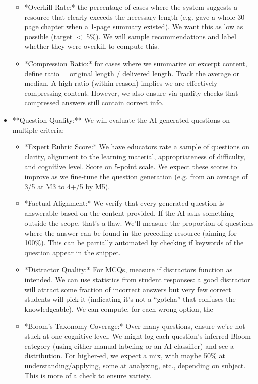 \documentclass[11pt]{article}
\begin{document}
\begin{itemize}
\begin{itemize}
      \item *Overkill Rate:* the percentage of cases where the system suggests a resource that clearly exceeds the necessary length (e.g. gave a whole 30-page chapter when a 1-page summary existed). We want this as low as possible (target $<$ 5\%). We will sample recommendations and label whether they were overkill to compute this.
      \item *Compression Ratio:* for cases where we summarize or excerpt content, define ratio = original length / delivered length. Track the average or median. A high ratio (within reason) implies we are effectively compressing content. However, we also ensure via quality checks that compressed answers still contain correct info.
    \end{itemize}
  \item **Question Quality:** We will evaluate the AI-generated questions on multiple criteria:
    \begin{itemize}
      \item *Expert Rubric Score:* We have educators rate a sample of questions on clarity, alignment to the learning material, appropriateness of difficulty, and cognitive level. Score on 5-point scale. We expect these scores to improve as we fine-tune the question generation (e.g. from an average of 3/5 at M3 to 4+/5 by M5).
      \item *Factual Alignment:* We verify that every generated question is answerable based on the content provided. If the AI asks something outside the scope, that’s a flaw. We’ll measure the proportion of questions where the answer can be found in the preceding resource (aiming for 100\%). This can be partially automated by checking if keywords of the question appear in the snippet.
      \item *Distractor Quality:* For MCQs, measure if distractors function as intended. We can use statistics from student responses: a good distractor will attract some fraction of incorrect answers but very few correct students will pick it (indicating it’s not a “gotcha” that confuses the knowledgeable). We can compute, for each wrong option, the %
      \item *Bloom’s Taxonomy Coverage:* Over many questions, ensure we’re not stuck at one cognitive level. We might log each question’s inferred Bloom category (using either manual labeling or an AI classifier) and see a distribution. For higher-ed, we expect a mix, with maybe 50\% at understanding/applying, some at analyzing, etc., depending on subject. This is more of a check to ensure variety.

\end{itemize}
\end{itemize}
\end{document}
